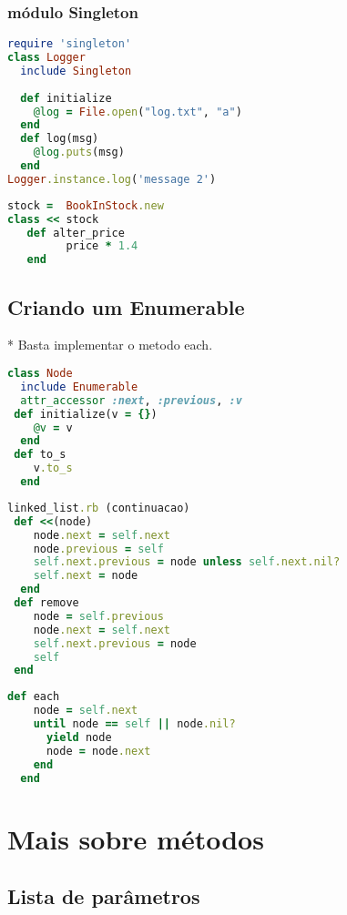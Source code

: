 \documentclass[serif,mathserif]{article}
\begin{document}
\subsubsection{módulo Singleton}
\begin{lstlisting}[language=ruby]
require 'singleton'
class Logger
  include Singleton
  
  def initialize
    @log = File.open("log.txt", "a")
  end
  def log(msg)
    @log.puts(msg)
  end
Logger.instance.log('message 2')
\end{lstlisting}

\begin{lstlisting}[language=ruby]
stock =  BookInStock.new
class << stock
   def alter_price
         price * 1.4
   end
\end{lstlisting}

\subsection{Criando um Enumerable}
  *  Basta implementar o metodo each. 
\begin{lstlisting}[language=ruby]
class Node
  include Enumerable 
  attr_accessor :next, :previous, :v
 def initialize(v = {})
    @v = v
  end
 def to_s
    v.to_s
  end
\end{lstlisting}

\begin{lstlisting}[language=ruby]
linked_list.rb (continuacao)
 def <<(node)
    node.next = self.next
    node.previous = self
    self.next.previous = node unless self.next.nil?
    self.next = node
  end
 def remove
    node = self.previous
    node.next = self.next
    self.next.previous = node
    self
 end
\end{lstlisting}

\begin{lstlisting}[language=ruby]
  def each
    node = self.next
    until node == self || node.nil?
      yield node
      node = node.next
    end
  end

\end{lstlisting}



\section{Mais sobre métodos}

\subsection{Lista de parâmetros}
\end{document}
